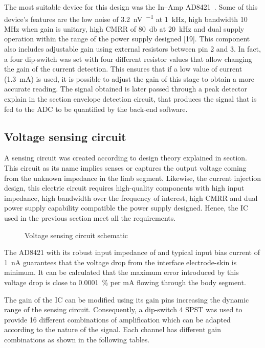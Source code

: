 The most suitable device for this design was the In–Amp AD8421~\cite{ad:AD8421}. Some of this device's features are the low noise of \SI{3.2}{\nano\volt\per{}} at \SI{1}{\kHz}, high bandwidth 10 MHz when gain is unitary, high CMRR of \SI{80}{\decibel} at \SI{20}{\kHz} and dual supply operation within the range of the power supply designed [19]. This component also includes adjustable gain using external resistors between pin 2 and 3. In fact, a four dip-switch was set with four different resistor values that allow changing the gain of the current detection. This ensures that if a low value of current (\SI{1.3}{\mA}) is used, it is possible to adjust the gain of this stage to obtain a more accurate reading. The signal obtained is later passed through a peak detector explain in the section envelope detection circuit, that produces the signal that is fed to the ADC to be quantified by the back-end software. 

\subsection{Voltage sensing circuit}
A sensing circuit was created according to design theory explained in section. This circuit as its name implies senses or captures the output voltage coming from the unknown impedance in the limb segment. Likewise, the current injection design, this electric circuit requires high-quality components with high input impedance, high bandwidth over the frequency of interest, high CMRR and dual power supply capability compatible the power supply designed. Hence, the IC used in the previous section meet all the requirements. 

\begin{figure}
    \label{fig:sensing}
    \caption{Voltage sensing circuit schematic}
\end{figure}

The AD8421\cite{ad:AD8421} with its robust input impedance of and typical input bias current of \SI{1}{\nA} guarantees that the voltage drop from the interface electrode-skin is minimum. It can be calculated that the maximum error introduced by this voltage drop is close to \SI{0.0001}{\percent} per mA flowing through the body segment. 

The gain of the IC can be modified using its gain pins increasing the dynamic range of the sensing circuit. Consequently, a dip-switch 4 SPST was used to provide 16 different combinations of amplification which can be adapted according to the nature of the signal. Each channel has different gain combinations as shown in the following tables.


